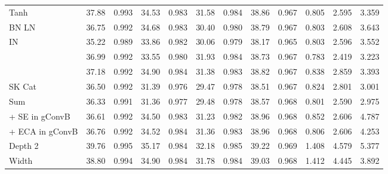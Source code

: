 \documentclass[10pt,twocolumn,letterpaper]{article}
\newcommand{\gr}{\rowcolor[rgb]{0.95,0.97,1.0}}
\newcommand{\rt}{\textcolor[rgb]{0.75,0.25,0.25}}
\newcommand{\gt}{\textcolor[rgb]{0.25,0.75,0.25}}
\begin{document}
\begin{table*}[t]
\begin{center}
{\begin{threeparttable}
\begin{tabular}{lccccccccccc}
                \hspace{3.35em}  Tanh     &    {37.88} &    {0.993} &    {34.53} &    {0.983} &    {31.58} &    {0.984} &    {38.86} &    {0.967} &    {0.805} &    {2.595} & \gt{3.359} \\
                \gr BN  LN                & \rt{36.75} & \rt{0.992} & \gt{34.68} &    {0.983} & \rt{30.40} & \rt{0.980} & \rt{38.79} &    {0.967} & \gt{0.803} & \rt{2.608} & \rt{3.643} \\
                \gr \hspace{1.4em}  IN    & \rt{35.22} & \rt{0.989} & \rt{33.86} & \rt{0.982} & \rt{30.06} & \rt{0.979} & \rt{38.17} & \rt{0.965} & \gt{0.803} & \rt{2.596} & \rt{3.552} \\
                                & \rt{36.99} & \rt{0.992} & \rt{33.55} & \rt{0.980} & \gt{31.93} &    {0.984} & \rt{38.73} &    {0.967} & \gt{0.783} & \gt{2.419} & \gt{3.223} \\
                \hspace{2.4em}       & \rt{37.18} & \rt{0.992} & \gt{34.90} & \gt{0.984} & \rt{31.38} &    {0.983} &    {38.82} &    {0.967} & \rt{0.838} & \rt{2.859} & \rt{3.393} \\
                \gr SK  Cat               & \rt{36.50} & \rt{0.992} & \rt{31.39} & \rt{0.976} & \rt{29.47} & \rt{0.978} & \rt{38.51} &    {0.967} & \rt{0.824} & \rt{2.801} & \gt{3.001} \\
                \gr \hspace{1.3em}  Sum   & \rt{36.33} & \rt{0.991} & \rt{31.36} & \rt{0.977} & \rt{29.48} & \rt{0.978} & \rt{38.57} &    {0.968} & \gt{0.801} & \gt{2.590} & \gt{2.975} \\
                + SE in gConvB                         & \rt{36.61} & \rt{0.992} &    {34.50} &    {0.983} & \rt{31.23} & \rt{0.982} & \gt{38.96} &    {0.968} & \rt{0.852} & \rt{2.606} & \rt{4.787} \\
                + ECA in gConvB                        & \rt{36.76} & \rt{0.992} &    {34.52} & \gt{0.984} & \rt{31.36} &    {0.983} & \gt{38.96} &    {0.968} & \rt{0.806} & \rt{2.606} & \rt{4.253} \\
                \gr Depth  2                   & \gt{39.76} & \gt{0.995} & \gt{35.17} & \gt{0.984} & \gt{32.18} & \gt{0.985} & \gt{39.22} & \gt{0.969} & \rt{1.408} & \rt{4.579} & \rt{5.377} \\
                \gr Width           & \gt{38.80} & \gt{0.994} & \gt{34.90} & \gt{0.984} & \gt{31.78} &    {0.984} & \gt{39.03} &    {0.968} & \rt{1.412} & \rt{4.445} & \rt{3.892} \\

\end{tabular}
\end{threeparttable}}
\end{center}
\end{table*}
\end{document}
